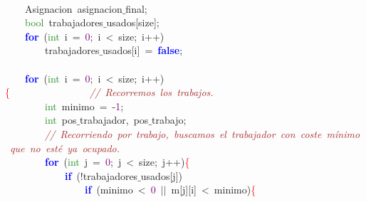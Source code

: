\mbox{}\ \ \ \  \\
\mbox{}\ \ \ \ \textcolor{TealBlue}{Asignacion}\ asignacion$\_$final\textcolor{BrickRed}{;}\  \\
\mbox{}\ \ \ \ \textcolor{ForestGreen}{bool}\ trabajadores$\_$usados\textcolor{BrickRed}{[}size\textcolor{BrickRed}{];}\  \\
\mbox{}\ \ \ \ \textbf{\textcolor{Blue}{for}}\ \textcolor{BrickRed}{(}\textcolor{ForestGreen}{int}\ i\ \textcolor{BrickRed}{=}\ \textcolor{Purple}{0}\textcolor{BrickRed}{;}\ i\ \textcolor{BrickRed}{\textless{}}\ size\textcolor{BrickRed}{;}\ i\textcolor{BrickRed}{++)} \\
\mbox{}\ \ \ \ \ \ \ \ trabajadores$\_$usados\textcolor{BrickRed}{[}i\textcolor{BrickRed}{]}\ \textcolor{BrickRed}{=}\ \textbf{\textcolor{Blue}{false}}\textcolor{BrickRed}{;}\  \\
\mbox{}\ \ \ \  \\
\mbox{}\ \ \ \ \textbf{\textcolor{Blue}{for}}\ \textcolor{BrickRed}{(}\textcolor{ForestGreen}{int}\ i\ \textcolor{BrickRed}{=}\ \textcolor{Purple}{0}\textcolor{BrickRed}{;}\ i\ \textcolor{BrickRed}{\textless{}}\ size\textcolor{BrickRed}{;}\ i\textcolor{BrickRed}{++)}\textcolor{Red}{\{}\ \ \ \ \ \ \ \ \ \ \ \ \ \ \ \ \textit{\textcolor{Brown}{//\ Recorremos\ los\ trabajos.\ }} \\
\mbox{}\ \ \ \ \ \ \ \ \textcolor{ForestGreen}{int}\ minimo\ \textcolor{BrickRed}{=}\ \textcolor{BrickRed}{-}\textcolor{Purple}{1}\textcolor{BrickRed}{;} \\
\mbox{}\ \ \ \ \ \ \ \ \textcolor{ForestGreen}{int}\ pos$\_$trabajador\textcolor{BrickRed}{,}\ pos$\_$trabajo\textcolor{BrickRed}{;}\  \\
\mbox{}\ \ \ \ \ \ \ \ \textit{\textcolor{Brown}{//\ Recorriendo\ por\ trabajo,\ buscamos\ el\ trabajador\ con\ coste\ mínimo\ que\ no\ esté\ ya\ ocupado.}} \\
\mbox{}\ \ \ \ \ \ \ \ \textbf{\textcolor{Blue}{for}}\ \textcolor{BrickRed}{(}\textcolor{ForestGreen}{int}\ j\ \textcolor{BrickRed}{=}\ \textcolor{Purple}{0}\textcolor{BrickRed}{;}\ j\ \textcolor{BrickRed}{\textless{}}\ size\textcolor{BrickRed}{;}\ j\textcolor{BrickRed}{++)}\textcolor{Red}{\{} \\
\mbox{}\ \ \ \ \ \ \ \ \ \ \ \ \textbf{\textcolor{Blue}{if}}\ \textcolor{BrickRed}{(!}trabajadores$\_$usados\textcolor{BrickRed}{[}j\textcolor{BrickRed}{])}\  \\
\mbox{}\ \ \ \ \ \ \ \ \ \ \ \ \ \ \ \ \textbf{\textcolor{Blue}{if}}\ \textcolor{BrickRed}{(}minimo\ \textcolor{BrickRed}{\textless{}}\ \textcolor{Purple}{0}\ \textcolor{BrickRed}{$|$$|$}\ m\textcolor{BrickRed}{[}j\textcolor{BrickRed}{][}i\textcolor{BrickRed}{]}\ \textcolor{BrickRed}{\textless{}}\ minimo\textcolor{BrickRed}{)}\textcolor{Red}{\{} \\
